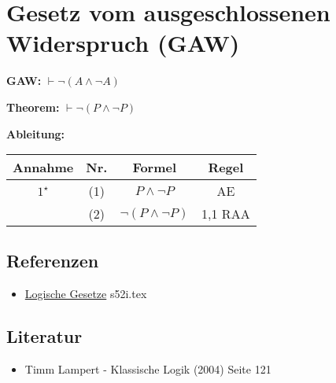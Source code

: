 \documentclass{sajzk}
\begin{document}
\section{Gesetz vom ausgeschlossenen Widerspruch (GAW)}
\label{3z0c}
\textbf{GAW:} $\vdash \lnot(A\land\lnot A)$

\textbf{Theorem:} $\vdash \lnot(P\land\lnot P)$

\textbf{Ableitung:}
\begin{center}
\begin{tabular}{|c|c|c|c|}
  \hline
  Annahme            & Nr. & Formel                    & Regel \\
  \hline
  $1^\star$          & (1)    & $P\land\lnot P$        & AE \\
  \hline
                     & (2)    & $\lnot(P\land\lnot P)$ & 1,1 RAA \\
  \hline
\end{tabular}
\end{center}

\subsection{Referenzen}
\begin{itemize}
    \item \href{s52i.pdf}{Logische Gesetze} s52i.tex
\end{itemize}

\subsection{Literatur}
\begin{itemize}
    \item Timm Lampert - Klassische Logik (2004) Seite 121
\end{itemize}
\end{document}
